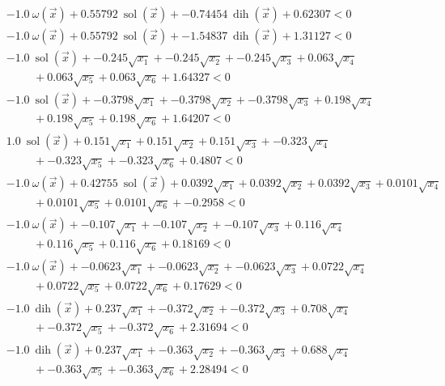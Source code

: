 \documentclass{article} %
\DeclareMathOperator{\sol}{sol}
\DeclareMathOperator{\dih}{dih}
\newcommand{\vx}{\vec{x}}
\begin{document}
\begin{align*}
&-1.0\ \omega(\vx) + 0.55792\ \sol(\vx) + -0.74454\ \dih(\vx) + 0.62307 < 0 \tag{D\_720788076} \\
&-1.0\ \omega(\vx) + 0.55792\ \sol(\vx) + -1.54837\ \dih(\vx) + 1.31127 < 0 \tag{D\_554235027} \\
&-1.0\ \sol(\vx) + -0.245\sqrt{x_1} +-0.245\sqrt{x_2} +-0.245\sqrt{x_3} +0.063\sqrt{x_4} \\ &\hspace{1cm} + 0.063\sqrt{x_5} +0.063\sqrt{x_6} +1.64327 < 0 \tag{D\_992963254} \\
&-1.0\ \sol(\vx) + -0.3798\sqrt{x_1} +-0.3798\sqrt{x_2} +-0.3798\sqrt{x_3} +0.198\sqrt{x_4} \\ &\hspace{1cm} +0.198\sqrt{x_5} +0.198\sqrt{x_6} +1.64207 < 0 \tag{D\_157321192} \\
&1.0\ \sol(\vx) + 0.151\sqrt{x_1} +0.151\sqrt{x_2} +0.151\sqrt{x_3} +-0.323\sqrt{x_4} \\ &\hspace{1cm} +-0.323\sqrt{x_5} +-0.323\sqrt{x_6} +0.4807 < 0 \tag{D\_954705068} \\
&-1.0\ \omega(\vx) + 0.42755\ \sol(\vx) + 0.0392\sqrt{x_1} +0.0392\sqrt{x_2} +0.0392\sqrt{x_3} +0.0101\sqrt{x_4} \\ &\hspace{1cm} +0.0101\sqrt{x_5} +0.0101\sqrt{x_6} +-0.2958 < 0 \tag{D\_607292193} \\
&-1.0\ \omega(\vx) + -0.107\sqrt{x_1} +-0.107\sqrt{x_2} +-0.107\sqrt{x_3} +0.116\sqrt{x_4} \\ &\hspace{1cm} +0.116\sqrt{x_5} +0.116\sqrt{x_6} +0.18169 < 0 \tag{D\_852636576} \\
&-1.0\ \omega(\vx) + -0.0623\sqrt{x_1} +-0.0623\sqrt{x_2} +-0.0623\sqrt{x_3} +0.0722\sqrt{x_4} \\ &\hspace{1cm} +0.0722\sqrt{x_5} +0.0722\sqrt{x_6} +0.17629 < 0 \tag{D\_981457443} \\
&-1.0\ \dih(\vx) + 0.237\sqrt{x_1} +-0.372\sqrt{x_2} +-0.372\sqrt{x_3} +0.708\sqrt{x_4} \\ &\hspace{1cm} +-0.372\sqrt{x_5} +-0.372\sqrt{x_6} +2.31694 < 0 \tag{D\_400655725} \\
&-1.0\ \dih(\vx) + 0.237\sqrt{x_1} +-0.363\sqrt{x_2} +-0.363\sqrt{x_3} +0.688\sqrt{x_4} \\ &\hspace{1cm} +-0.363\sqrt{x_5} +-0.363\sqrt{x_6} +2.28494 < 0 \tag{D\_552790530} \\

\end{align*}
\end{document}
